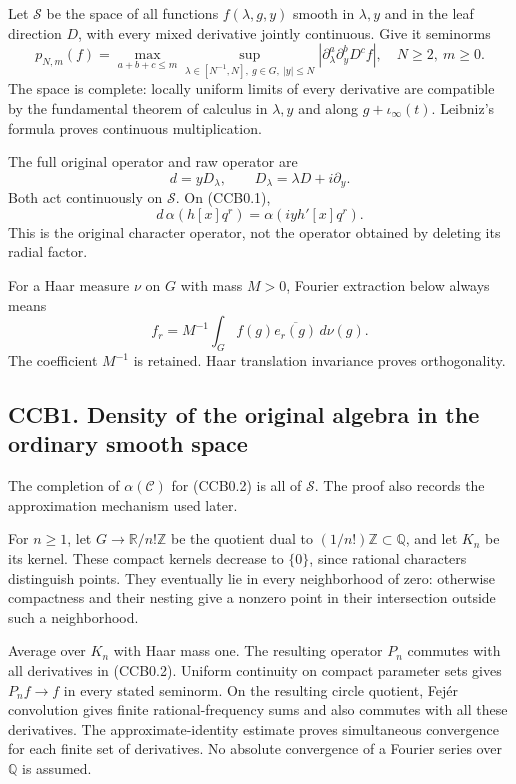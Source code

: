 Let \(\mathcal S\) be the space of all functions \(f(\lambda,g,y)\)
smooth in \(\lambda,y\) and in the leaf direction \(D\), with every
mixed derivative jointly continuous. Give it seminorms \[
p_{N,m}(f)=
\max_{a+b+c\le m}
\sup_{\lambda\in[N^{-1},N],\ g\in G,\ |y|\le N}
|\partial_\lambda^a\partial_y^bD^cf|,
\quad N\ge2,\ m\ge0.
\tag{CCB0.2}
\] The space is complete: locally uniform limits of every derivative are
compatible by the fundamental theorem of calculus in \(\lambda,y\) and
along \(g+\iota_\infty(t)\). Leibniz's formula proves continuous
multiplication.

The full original operator and raw operator are \[
d=yD_\lambda,\qquad D_\lambda=\lambda D+i\partial_y.
\tag{CCB0.3}
\] Both act continuously on \(\mathcal S\). On (CCB0.1), \[
d\,\alpha(h[x]q^r)
=\alpha(iyh'[x]q^r).
\] This is the original character operator, not the operator obtained by
deleting its radial factor.

For a Haar measure \(\nu\) on \(G\) with mass \(M>0\), Fourier
extraction below always means \[
f_r=M^{-1}\int_G f(g)\overline{e_r(g)}\,d\nu(g).
\tag{CCB0.4}
\] The coefficient \(M^{-1}\) is retained. Haar translation invariance
proves orthogonality.

\subsection{CCB1. Density of the original algebra in the ordinary smooth
space}\label{ccb1.-density-of-the-original-algebra-in-the-ordinary-smooth-space}

The completion of \(\alpha(\mathcal C)\) for (CCB0.2) is all of
\(\mathcal S\). The proof also records the approximation mechanism used
later.

For \(n\ge1\), let \(G\to\mathbb R/n!\mathbb Z\) be the quotient dual to
\((1/n!)\mathbb Z\subset\mathbb Q\), and let \(K_n\) be its kernel.
These compact kernels decrease to \(\{0\}\), since rational characters
distinguish points. They eventually lie in every neighborhood of zero:
otherwise compactness and their nesting give a nonzero point in their
intersection outside such a neighborhood.

Average over \(K_n\) with Haar mass one. The resulting operator \(P_n\)
commutes with all derivatives in (CCB0.2). Uniform continuity on compact
parameter sets gives \(P_nf\to f\) in every stated seminorm. On the
resulting circle quotient, Fejér convolution gives finite
rational-frequency sums and also commutes with all these derivatives.
The approximate-identity estimate proves simultaneous convergence for
each finite set of derivatives. No absolute convergence of a Fourier
series over \(\mathbb Q\) is assumed.

